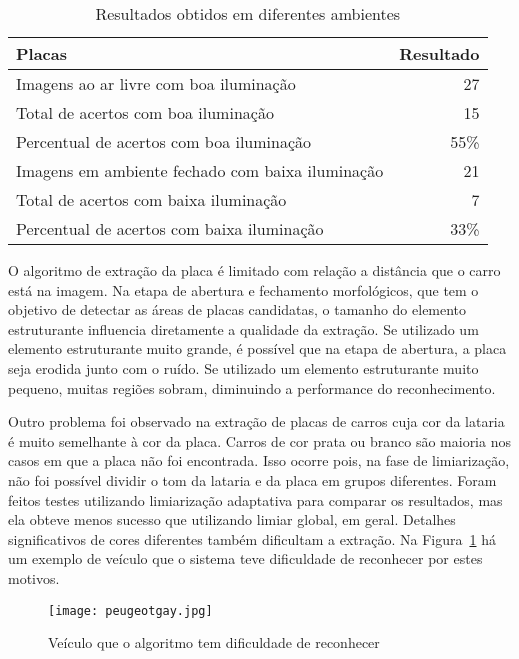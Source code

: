 \begin{table}[]
\centering
\caption{Resultados obtidos em diferentes ambientes}
\label{tab:resultados_ambientes}
\begin{tabular}{@{}lr@{}}
\toprule
Placas                                      		& \multicolumn{1}{l}{Resultado} \\ \midrule
Imagens ao ar livre com boa iluminação     			& 27                            \\
Total de acertos com boa iluminação    			 	& 15                            \\
Percentual de acertos com boa iluminação    		 & 55\%                            \\
Imagens em ambiente fechado com baixa iluminação     & 21                            \\
Total de acertos com baixa iluminação    			 & 7                            \\
Percentual de acertos com baixa iluminação 			& 33\%
\end{tabular}
\end{table}

O algoritmo de extração da placa é limitado com relação a distância que o carro
está na imagem. Na etapa de abertura e fechamento morfológicos, que tem o
objetivo de detectar as áreas de placas candidatas, o tamanho do elemento
estruturante influencia diretamente a qualidade da extração. Se utilizado um
elemento estruturante muito grande, é possível que na etapa de abertura, a placa
seja erodida junto com o ruído. Se utilizado um elemento estruturante muito
pequeno, muitas regiões sobram, diminuindo a performance do reconhecimento.

Outro problema foi observado na extração de placas de carros cuja cor da lataria
é muito semelhante à cor da placa. Carros de cor prata ou branco são maioria nos casos
em que a placa não foi encontrada. Isso ocorre pois, na fase de limiarização, não foi 
possível dividir o tom da lataria e da placa em grupos diferentes. Foram feitos testes
utilizando limiarização adaptativa para comparar os resultados, mas ela obteve menos sucesso
que utilizando limiar global, em geral. Detalhes significativos de cores diferentes também dificultam
a extração. Na Figura~\ref{fig:peugeot_gay} há um exemplo de veículo que o sistema teve dificuldade
de reconhecer por estes motivos.

\begin{figure}[H]
	\centering
	\texttt{[image: peugeotgay.jpg]}
	\caption{Veículo que o algoritmo tem dificuldade de reconhecer}
	\label{fig:peugeot_gay}
\end{figure}

